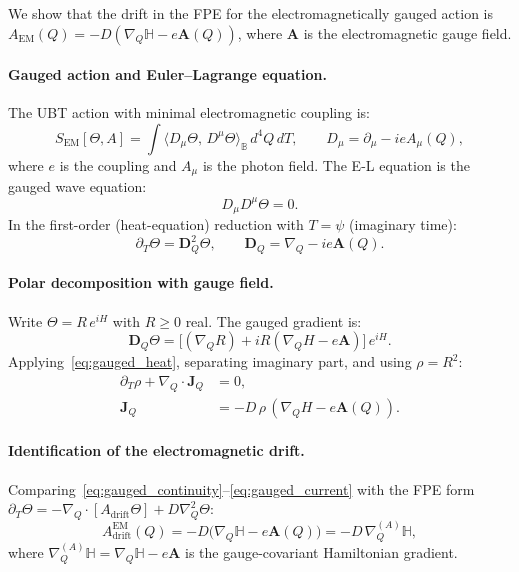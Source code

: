 \documentclass[12pt]{article}
\theoremstyle{definition}
\theoremstyle{remark}
\begin{document}
We show that the drift in the FPE for the electromagnetically gauged action
is $A_{\mathrm{EM}}(Q) = -D(\nabla_Q\mathbb{H} - e\mathbf{A}(Q))$, where
$\mathbf{A}$ is the electromagnetic gauge field.

\paragraph{Gauged action and Euler--Lagrange equation.}
The UBT action with minimal electromagnetic coupling is:
\begin{equation}
  S_{\mathrm{EM}}[\Theta, A]
  = \int \bigl\langle D_\mu\Theta,\, D^\mu\Theta \bigr\rangle_\mathbb{B}\,d^4Q\,dT,
  \qquad D_\mu = \partial_\mu - ie A_\mu(Q),
  \label{eq:gauged_action}
\end{equation}
where $e$ is the coupling and $A_\mu$ is the photon field.
The E-L equation is the gauged wave equation:
\begin{equation}
  D_\mu D^\mu\Theta = 0.
  \label{eq:gauged_el}
\end{equation}
In the first-order (heat-equation) reduction with $T = \psi$ (imaginary time):
\begin{equation}
  \partial_T\Theta = \mathbf{D}_Q^2\Theta,
  \qquad \mathbf{D}_Q = \nabla_Q - ie\mathbf{A}(Q).
  \label{eq:gauged_heat}
\end{equation}

\paragraph{Polar decomposition with gauge field.}
Write $\Theta = R\,e^{iH}$ with $R \geq 0$ real.  The gauged gradient is:
\begin{equation}
  \mathbf{D}_Q\Theta
  = \bigl[(\nabla_Q R) + iR(\nabla_Q H - e\mathbf{A})\bigr]\,e^{iH}.
\end{equation}
Applying~\eqref{eq:gauged_heat}, separating imaginary part, and using
$\rho = R^2$:
\begin{align}
  \partial_T\rho + \nabla_Q \cdot \mathbf{J}_Q &= 0,
  \label{eq:gauged_continuity} \\
  \mathbf{J}_Q &= -D\,\rho\,(\nabla_Q H - e\mathbf{A}(Q)).
  \label{eq:gauged_current}
\end{align}

\paragraph{Identification of the electromagnetic drift.}
Comparing~\eqref{eq:gauged_continuity}--\eqref{eq:gauged_current} with
the FPE form $\partial_T\Theta = -\nabla_Q\cdot[A_{\mathrm{drift}}\Theta] + D\nabla_Q^2\Theta$:
\begin{equation}
  \boxed{
  A_{\mathrm{drift}}^{\mathrm{EM}}(Q)
  = -D\bigl(\nabla_Q\mathbb{H} - e\mathbf{A}(Q)\bigr)
  = -D\,\nabla_Q^{(A)}\mathbb{H},
  }
  \label{eq:em_drift}
\end{equation}
where $\nabla_Q^{(A)}\mathbb{H} = \nabla_Q\mathbb{H} - e\mathbf{A}$ is the
gauge-covariant Hamiltonian gradient.
\end{document}
